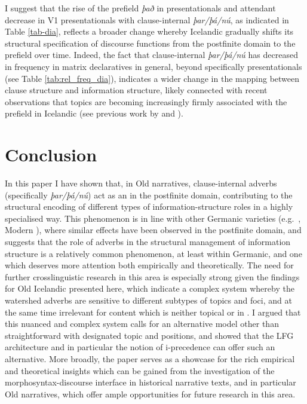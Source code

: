 \documentclass[output=paper,colorlinks,citecolor=brown]{langscibook}
\begin{document}
I suggest that the rise of the prefield  \textit{það} in presentationals and attendant decrease in V1 presentationals with clause-internal \textit{þar/þá/nú}, as indicated in Table \ref{tab-dia}, reflects a broader change whereby Icelandic gradually shifts its structural specification of discourse functions from the postfinite domain to the prefield over time. 
Indeed, the fact that clause-internal \textit{þar/þá/nú} has decreased in frequency in matrix declaratives in general, beyond specifically presentationals (see Table \ref{tab:rel_freq_dia}), indicates a wider change in the mapping between clause structure and information structure, likely connected with recent observations that topics are becoming increasingly firmly associated with the prefield in Icelandic (see previous work by \citealt{bsbb:2017} and \citealt{booth-beck20200jhs}).


\section{Conclusion}\label{sect:conc}


In this paper I have shown that, in Old  narratives, clause-internal adverbs (specifically \textit{þar/þá/nú}) act as an  in the postfinite domain, contributing to the structural encoding of different types of information-structure roles in a highly specialised way. This phenomenon is in line with other Germanic varieties (e.g.~, Modern ), where similar effects have been observed in the postfinite domain, and suggests that the role of adverbs in the structural management of information structure is a relatively common phenomenon, at least within Germanic, and one which deserves more attention both empirically and theoretically. The need for further crosslinguistic research in this area is especially strong given the findings for Old Icelandic presented here, 
which indicate a complex system whereby the watershed adverbs are sensitive to different subtypes of topics and foci, and at the same time irrelevant for content which is neither topical or in . I argued that this nuanced and complex system calls for an alternative model other than straightforward  with designated topic and  positions, and showed that the LFG architecture and in particular the notion of i-precedence can offer such an alternative.
More broadly, the paper serves as a showcase for the rich empirical and theoretical insights which can be gained from the investigation of the morphosyntax-discourse interface in historical narrative texts, and in particular Old  narratives, which offer ample opportunities for future research in this area.
\end{document}
